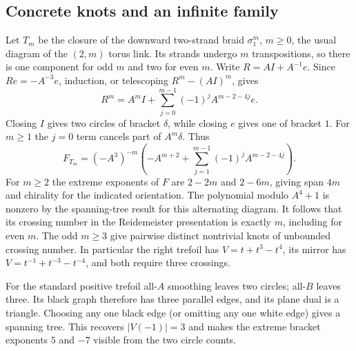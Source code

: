 \subsection{Concrete knots and an infinite family}

Let $T_m$ be the closure of the downward two-strand braid $\sigma_1^m$,
$m\ge0$, the usual diagram of the $(2,m)$ torus link. Its strands
undergo $m$ transpositions, so there is one component for odd $m$ and
two for even $m$. Write $R=AI+A^{-1}e$. Since $Re=-A^{-3}e$,
induction, or telescoping $R^m-(AI)^m$, gives
\[
 R^m=A^m I+\sum_{j=0}^{m-1}(-1)^j A^{m-2-4j} e.
\]
Closing $I$ gives two circles of bracket $\delta$, while closing $e$
gives one of bracket $1$. For $m\ge1$ the $j=0$ term cancels part of
$A^m\delta$. Thus
\[
 F_{T_m}=(-A^3)^{-m}\left(-A^{m+2}
           +\sum_{j=1}^{m-1}(-1)^j A^{m-2-4j}\right).
\]
For $m\ge2$ the extreme exponents of $F$ are $2-2m$ and $2-6m$,
giving span $4m$ and chirality for the indicated orientation. The
polynomial modulo $A^4+1$ is nonzero by the spanning-tree result for this
alternating diagram. It follows that its crossing number in the
Reidemeister presentation is exactly $m$, including for even $m$.
The odd $m\ge3$ give pairwise distinct nontrivial knots of unbounded
crossing number. In particular the right trefoil has $V=t+t^3-t^4$,
its mirror has $V=t^{-1}+t^{-3}-t^{-4}$, and both require three crossings.

\begin{center}
\end{center}
\noindent For the standard positive trefoil all-$A$ smoothing leaves two circles; all-$B$ leaves three. Its black graph therefore has three parallel edges, and its plane dual is a triangle. Choosing any one black edge (or omitting any one white edge) gives a spanning tree. This recovers $|V(-1)|=3$ and makes the extreme bracket exponents $5$ and $-7$ visible from the two circle counts.


